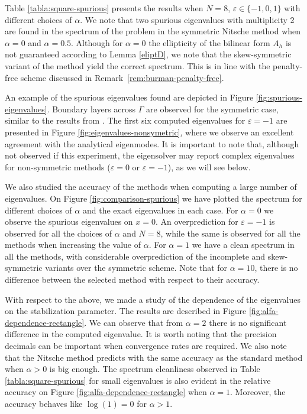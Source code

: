 \documentclass[onefignum,onetabnum,final]{siamart250211}
\numberwithin{equation}{section}
\newcommand\0{\boldsymbol{0}}
\begin{document}
	Table \ref{tabla:square-spurious} presents the results when $N=8$, $\varepsilon\in\{-1,0,1\}$ with different choices of $\alpha$. We note that two spurious eigenvalues with multiplicity 2 are found in the spectrum of the problem in the symmetric Nitsche method when $\alpha=0$ and $\alpha=0.5$. Although for $\alpha=0$ the ellipticity of the bilinear form $A_h$ is not guaranteed according to Lemma \ref{eliptD}, we note that the skew-symmetric variant of the method yield the correct spectrum.
	This is in line with the penalty-free scheme discussed in Remark~\ref{rem:burman-penalty-free}.
	
	An example of the spurious eigenvalues found are depicted in Figure \ref{fig:spurious-eigenvalues}. Boundary layers across $\Gamma$ are observed for the symmetric case, similar to the results from \cite[Section 3]{harari2018spectral}. The first six computed eigenvalues for $\varepsilon=-1$ are presented in Figure \ref{fig:eigenvalues-nonsymetric}, where we observe an excellent agreement with the analytical eigenmodes. It is important to note that, although not observed if this experiment, the eigensolver may report complex eigenvalues for non-symmetric methods ($\varepsilon=0$ or $\varepsilon=-1$), as we will see below.
	
	We also studied the accuracy of the methods when computing a large number of eigenvalues. On Figure \ref{fig:comparison-spurious} we have plotted the spectrum for different choices of $\alpha$ and the exact eigenvalues in each case. For $\alpha=0$ we observe the spurious eigenvalues on $x=0$. An overprediction for $\varepsilon=-1$ is observed for all the choices of $\alpha$ and $N=8$, while the same is observed for all the methods when increasing the value of $\alpha$. For $\alpha=1$ we have a clean spectrum in all the methods, with considerable overprediction of the incomplete and skew-symmetric variants over the symmetric scheme. Note that for $\alpha=10$, there is no difference between the selected method with respect to their accuracy. 
	
	With respect to the above, we made a study of the dependence of the eigenvalues on the stabilization parameter. The results are described in Figure \ref{fig:alfa-dependence-rectangle}. We can observe that from $\alpha=2$ there is no significant difference in the computed eigenvalue. It is worth noting that the precision decimals can be important when convergence rates are required. We also note that the Nitsche method predicts with the same accuracy as the standard method when $\alpha>0$ is big enough. The spectrum cleanliness observed in Table \ref{tabla:square-spurious} for small eigenvalues is also evident in the relative accuracy on Figure \ref{fig:alfa-dependence-rectangle} when $\alpha=1$. Moreover, the accuracy behaves like $\log(1)=0$ for $\alpha>1$.
	
\end{document}
